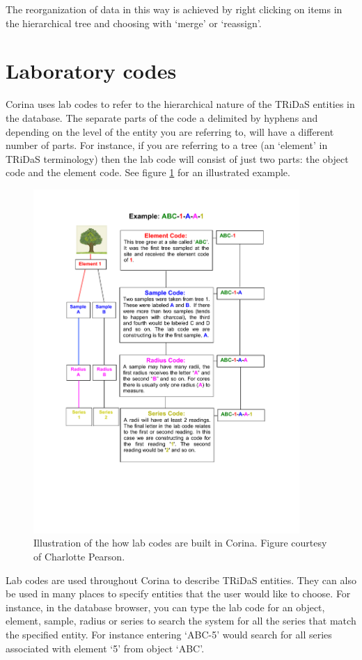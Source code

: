 The reorganization of data in this way is achieved by right clicking on items in the hierarchical tree and choosing with `merge' or `reassign'.


\section{Laboratory codes}
Corina uses lab codes to refer to the hierarchical nature of the TRiDaS entities in the database.  The separate parts of the code a delimited by hyphens and depending on the level of the entity you are referring to, will have a different number of parts.  For instance, if you are referring to a tree (an `element' in TRiDaS terminology) then the lab code will consist of just two parts: the object code and the element code.  See figure \ref{fig:labcodes} for an illustrated example.

\begin{figure}
\centering
\includegraphics[trim = 1in 1.5in 1in 0.5in, clip, width=0.9\textwidth]{Images/CorinaSampleCodes.pdf}
\caption{Illustration of the how lab codes are built in Corina.  Figure courtesy of Charlotte Pearson.} 
\label{fig:labcodes}
\end{figure}

Lab codes are used throughout Corina to describe TRiDaS entities.  They can also be used in many places to specify entities that the user would like to choose.  For instance, in the database browser, you can type the lab code for an object, element, sample, radius or series to search the system for all the series that match the specified entity.  For instance entering `ABC-5' would search for all series associated with element `5' from object `ABC'.





